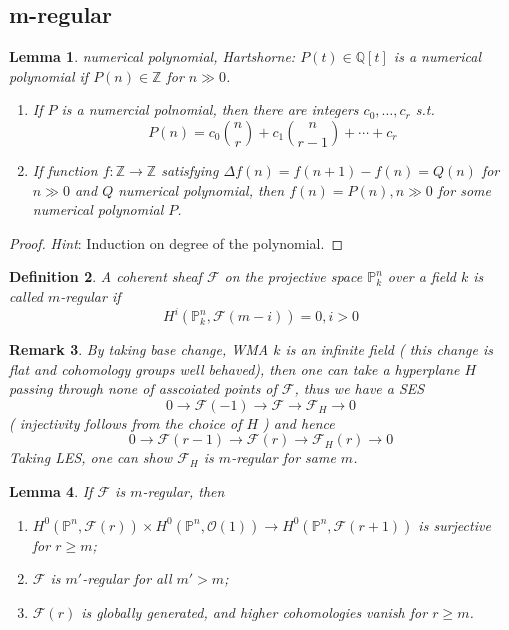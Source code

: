 \documentclass{article}
\newtheorem{defn}{Definition}[section]
\newtheorem{lem}[defn]{Lemma}
\newtheorem{rmk}[defn]{Remark}
\begin{document}
\subsection{m-regular}
\begin{lem}
	\emph{numerical polynomial, Hartshorne}: $ P(t)\in\mathbb{Q}[t] $ is a \emph{numerical polynomial} if $ P(n)\in \mathbb{Z} $ for $ n\gg0 $.
	\begin{enumerate}
		\item If $ P $ is a numercial polnomial, then there are \emph{integers} $ c_0,\ldots,c_r $  s.t.
		$$ P(n)=c_0\binom{n}{r}+c_1\binom{n}{r-1}+\cdots+c_r $$
		\item If function $ f:\mathbb{Z}\to \mathbb{Z} $ satisfying $ \Delta f(n)=f(n+1)-f(n)=Q(n) $ for $ n\gg0 $ and $ Q $ numerical polynomial, then $ f(n)=P(n) ,n\gg0$ for some numerical polynomial $ P $. 
	\end{enumerate}
\end{lem}
\begin{proof}
	\emph{Hint}: Induction on degree of the polynomial.
\end{proof}
\begin{defn}
	A coherent sheaf $ \mathcal{F} $  on the projective space $ \mathbb{P}^n_k $ over a field $ k $ is called \emph{$ m $-regular} if 
	$$ H^i(\mathbb{P}^n_k,\mathcal{F}(m-i))=0,i>0 $$
\end{defn}
\begin{rmk}
	By taking base change, WMA $ k $ is an infinite field ( this change is flat and cohomology groups well behaved), then one can take a hyperplane $ H $ passing through none of asscoiated points of $ \mathcal{F} $, thus we have a SES
	$$ 0\to \mathcal{F}(-1)\to \mathcal{F}\to \mathcal{F}_H\to 0 $$
	( injectivity follows from the choice of $ H $ ) and hence 
	$$ 0\to \mathcal{F}(r-1)\to \mathcal{F}(r)\to \mathcal{F}_H(r)\to 0 $$
	Taking LES, one can show $ \mathcal{F}_H $ is $ m $-regular for same $ m $.
\end{rmk}
\begin{lem}
	If $ \mathcal{F} $ is $ m $-regular, then
	\begin{enumerate}
		\item $ H^0(\mathbb{P}^n,\mathcal{F}(r))\times H^0(\mathbb{P}^n,\mathcal{O}(1))\to H^0(\mathbb{P}^n,\mathcal{F}(r+1)) $ is surjective for $ r\geqslant m $;
		\item $ \mathcal{F} $ is $ m' $-regular for all $ m'>m $;
		\item $ \mathcal{F}(r) $ is globally generated, and higher cohomologies vanish for $ r\geqslant m $.
	\end{enumerate}
\end{lem}
\end{document}
